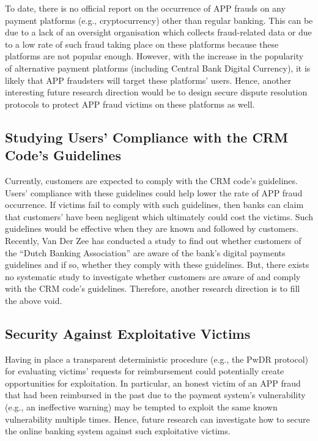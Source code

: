 To date, there is no official report on the occurrence of APP frauds on any payment platforms (e.g., cryptocurrency) other than regular banking. This can be due to a lack of an oversight organisation which collects fraud-related data or due to a low rate of such fraud taking place on these platforms because these platforms are not popular enough. However,  with the increase in the popularity of alternative payment platforms (including Central Bank Digital Currency), it is likely that APP fraudsters will target these platforms' users. Hence, another interesting future research direction would be to design secure dispute resolution protocols to protect  APP fraud victims on these platforms as well. 

\vspace{-2mm}

\subsection{Studying Users' Compliance with the CRM Code's Guidelines}

Currently,  customers are expected to comply with the CRM code's guidelines.  Users'  compliance with these guidelines could help lower the rate of APP fraud occurrence.  If victims fail to comply with such guidelines, then banks can claim that customers' have been negligent which ultimately could cost the victims. Such guidelines would be effective when they are known and followed by customers. Recently, Van Der Zee \cite{zee2021shifting}  has conducted a study to find out whether customers of the ``Dutch Banking Association'' are aware of the bank's digital payments guidelines and if so, whether they comply with these guidelines.  But, there exists no systematic study to investigate whether customers are aware of and comply with the CRM code's guidelines. Therefore, another research direction is to fill the above void. 


\vspace{-2mm}
\subsection{Security Against Exploitative Victims}



Having in place a transparent deterministic procedure (e.g.,  the PwDR protocol)  for evaluating victims' requests for reimbursement could potentially create opportunities for exploitation. In particular, an honest victim of an APP fraud that had been reimbursed in the past due to the payment system's vulnerability (e.g., an ineffective warning) may be tempted to exploit the same known vulnerability multiple times. Hence, future research can investigate how to secure the online banking system against such exploitative victims.











